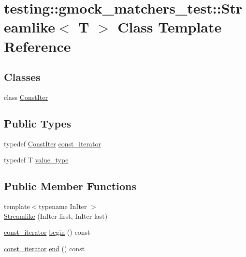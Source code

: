 \hypertarget{classtesting_1_1gmock__matchers__test_1_1_streamlike}{}\section{testing\+::gmock\+\_\+matchers\+\_\+test\+::Streamlike$<$ T $>$ Class Template Reference}
\label{classtesting_1_1gmock__matchers__test_1_1_streamlike}
\subsection*{Classes}
\begin{DoxyCompactItemize}
\item 
class \mbox{\hyperlink{classtesting_1_1gmock__matchers__test_1_1_streamlike_1_1_const_iter}{Const\+Iter}}
\end{DoxyCompactItemize}
\subsection*{Public Types}
\begin{DoxyCompactItemize}
\item 
typedef \mbox{\hyperlink{classtesting_1_1gmock__matchers__test_1_1_streamlike_1_1_const_iter}{Const\+Iter}} \mbox{\hyperlink{classtesting_1_1gmock__matchers__test_1_1_streamlike_a2eeb61dca56f70d0266f5f8ae91d2c7b}{const\+\_\+iterator}}
\item 
typedef T \mbox{\hyperlink{classtesting_1_1gmock__matchers__test_1_1_streamlike_a7e2c2e021676c1ed5dea63cdd019661c}{value\+\_\+type}}
\end{DoxyCompactItemize}
\subsection*{Public Member Functions}
\begin{DoxyCompactItemize}
\item 
{\footnotesize template$<$typename In\+Iter $>$ }\\\mbox{\hyperlink{classtesting_1_1gmock__matchers__test_1_1_streamlike_abf5560c86ad5d9563cb8f477f06046fe}{Streamlike}} (In\+Iter first, In\+Iter last)
\item 
\mbox{\hyperlink{classtesting_1_1gmock__matchers__test_1_1_streamlike_a2eeb61dca56f70d0266f5f8ae91d2c7b}{const\+\_\+iterator}} \mbox{\hyperlink{classtesting_1_1gmock__matchers__test_1_1_streamlike_a1ac125e14fd2358cdb727e0044ef7f01}{begin}} () const
\item 
\mbox{\hyperlink{classtesting_1_1gmock__matchers__test_1_1_streamlike_a2eeb61dca56f70d0266f5f8ae91d2c7b}{const\+\_\+iterator}} \mbox{\hyperlink{classtesting_1_1gmock__matchers__test_1_1_streamlike_a3e3aa6924974abcf7855dab1094bd860}{end}} () const
\end{DoxyCompactItemize}
